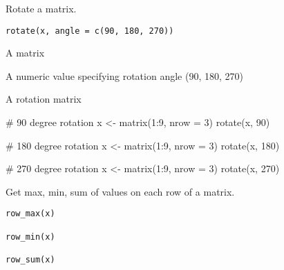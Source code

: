 \documentclass[letterpaper]{book}
\begin{document}
%
\begin{Examples}
\end{Examples}
%
\begin{Description}
Rotate a matrix.
\end{Description}
%
\begin{Usage}
\begin{verbatim}
rotate(x, angle = c(90, 180, 270))
\end{verbatim}
\end{Usage}
%
\begin{Arguments}
\begin{ldescription}
\item[\code{x}] A matrix

\item[\code{angle}] A numeric value specifying rotation angle (90, 180, 270)
\end{ldescription}
\end{Arguments}
%
\begin{Value}
A rotation matrix
\end{Value}
%
\begin{Examples}
\begin{ExampleCode}
# 90 degree rotation
x <- matrix(1:9, nrow = 3)
rotate(x, 90)

# 180 degree rotation
x <- matrix(1:9, nrow = 3)
rotate(x, 180)

# 270 degree rotation
x <- matrix(1:9, nrow = 3)
rotate(x, 270)

\end{ExampleCode}
\end{Examples}
%
\begin{Description}
Get max, min, sum of values on each row of a matrix.
\end{Description}
%
\begin{Usage}
\begin{verbatim}
row_max(x)

row_min(x)

row_sum(x)
\end{verbatim}
\end{Usage}
\end{document}
